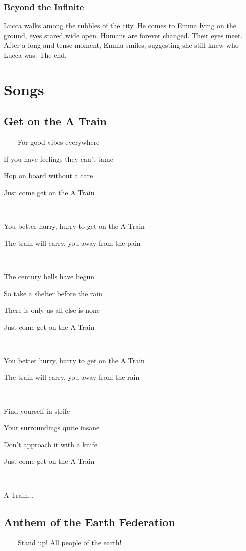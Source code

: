 \documentclass[11pt]{article}
\begin{document}
		\subsubsection{Beyond the Infinite}
		Lucca walks among the rubbles of the city. He comes to Emma lying on the ground, eyes stared wide open. 
		Humans are forever changed.
		Their eyes meet.
		After a long and tense moment, Emma smiles, suggesting she still knew who Lucca was. 
		The end.
\newpage








\section{Songs}
	\subsection{Get on the A Train}
	\ \ \ \ For good vibes everywhere
	
	If you have feelings they can't tame
	
	Hop on board without a care
	
	Just come get on the A Train
	
	\ 
	
	You better hurry, hurry to get on the A Train
	
	The train will carry, you away from the pain
	
	\ 
	
	The century bells have begun

	So take a shelter before the rain

	There is only us all else is none

	Just come get on the A Train

	\ 
		
	You better hurry, hurry to get on the A Train

	The train will carry, you away from the rain
	
	\ 
	
	Find yourself in strife
	
	Your surroundings quite insane
	
	Don't approach it with a knife
	
	Just come get on the A Train
	
	\ 
	
	A Train...
	\newpage

	\subsection{Anthem of the Earth Federation}
	\ \ \ \ Stand up! All people of the earth!
	
\end{document}

